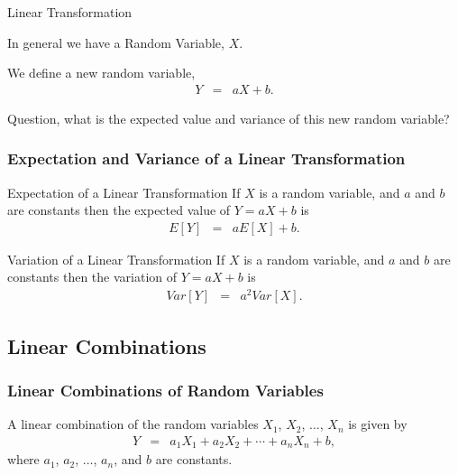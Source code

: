 \begin{frame}{Linear Transformation}

  In general we have a Random Variable, $X$.

  \vfill

  We define a new random variable,
  \begin{eqnarray*}
    Y & = & a X + b.
  \end{eqnarray*}

  \vfill

  Question, what is the expected value and variance of this new random
  variable?

  
\end{frame}


\begin{frame}
  \frametitle{Expectation and Variance of a Linear Transformation}

  \begin{block}{Expectation of a Linear Transformation}
    If $X$ is a random variable, and $a$ and $b$ are constants then
    the expected value of $Y=aX+b$ is 
    \begin{eqnarray*}
      E[Y] & = & a E[X] + b.
    \end{eqnarray*}
  \end{block}

  \begin{block}{Variation of a Linear Transformation}
    If $X$ is a random variable, and $a$ and $b$ are constants then
    the variation of $Y=aX+b$ is 
    \begin{eqnarray*}
      Var[Y] & = & a^2 Var[X].
    \end{eqnarray*}
  \end{block}

  
\end{frame}

\subsection{Linear Combinations}

\begin{frame}
  \frametitle{Linear Combinations of Random Variables}

  A linear combination of the random variables $X_1$, $X_2$, $\ldots$,
  $X_n$ is given by
  \begin{eqnarray*}
    Y & = & a_1 X_1 + a_2 X_2 + \cdots + a_n X_n + b,
  \end{eqnarray*}
  where $a_1$, $a_2$, $\ldots$, $a_n$, and $b$ are constants.
  
\end{frame}

